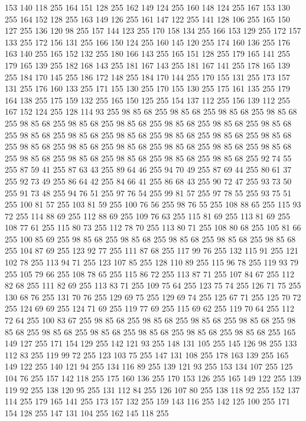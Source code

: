 153 140 118 255 164 151 128 255 162 149 124 255 160 148 124 255 167 153 130 255 164 152 128 255 163 149 126 255 161 147 122 255 141 128 106 255 165 150 127 255 136 120 98 255 157 144 123 255 170 158 134 255 166 153 129 255 172 157 133 255 172 156 131 255 166 150 124 255 160 145 120 255 174 160 136 255 176 163 140 255 165 152 132 255 180 166 143 255 165 151 128 255 179 165 141 255 179 165 139 255 182 168 143 255 181 167 143 255 181 167 141 255 178 165 139 255 184 170 145 255 186 172 148 255 184 170 144 255 170 155 131 255 173 157 131 255 176 160 133 255 171 155 130 255 170 155 130 255 175 161 135 255 179 164 138 255 175 159 132 255 165 150 125 255 154 137 112 255 156 139 112 255 167 152 124 255 128 114 93 255 98 85 68 255 98 85 68 255 98 85 68 255 98 85 68 255 98 85 68 255 98 85 68 255 98 85 68 255 98 85 68 255 98 85 68 255 98 85 68 255 98 85 68 255 98 85 68 255 98 85 68 255 98 85 68 255 98 85 68 255 98 85 68 255 98 85 68 255 98 85 68 255 98 85 68 255
98 85 68 255 98 85 68 255 98 85 68 255 98 85 68 255 98 85 68 255 98 85 68 255 98 85 68 255 98 85 68 255 92 74 55 255 87 59 41 255 87 63 43 255 89 64 46 255 94 70 49 255 87 69 44 255 80 61 37 255 92 73 49 255 86 64 42 255 84 66 41 255 86 68 43 255 90 72 47 255 93 73 50 255 91 73 48 255 94 76 51 255 97 76 54 255 99 81 57 255 97 78 55 255 93 75 51 255 100 81 57 255 103 81 59 255 100 76 56 255 98 76 55 255 108 88 65 255 115 93 72 255 114 88 69 255 112 88 69 255 109 76 63 255 115 81 69 255 113 81 69 255 108 77 61 255 115 80 73 255 112 78 70 255 113 80 71 255 108 80 68 255 105 81 66 255 100 85 69 255 98 85 68 255 98 85 68 255 98 85 68 255 98 85 68 255 98 85 68 255 104 87 69 255 123 92 77 255 111 87 68 255 117 99 76 255 132 115 91 255 121 102 78 255 113 94 71 255 123 107 85 255 128 110 89 255 115 96 78 255 119 93 79 255 105 79 66 255 108 78 65 255 115 86 72 255
113 87 71 255 107 84 67 255 112 82 68 255 111 82 69 255 113 83 71 255 109 75 64 255 123 75 74 255 126 71 75 255 130 68 76 255 131 70 76 255 129 69 75 255 129 69 74 255 125 67 71 255 125 70 72 255 124 69 69 255 124 71 69 255 119 77 69 255 115 69 62 255 119 70 64 255 112 72 64 255 100 83 67 255 98 85 68 255 98 85 68 255 98 85 68 255 98 85 68 255 98 85 68 255 98 85 68 255 98 85 68 255 98 85 68 255 98 85 68 255 98 85 68 255 165 149 127 255 171 154 129 255 142 121 93 255 148 131 105 255 145 126 98 255 133 112 83 255 119 99 72 255 123 103 75 255 147 131 108 255 178 163 139 255 165 149 122 255 140 121 94 255 134 116 89 255 139 121 93 255 153 134 107 255 125 104 76 255 157 142 118 255 175 160 136 255 170 153 126 255 165 149 122 255 139 119 92 255 138 120 95 255 131 112 84 255 126 107 80 255 138 118 92 255 152 137 114 255 179 165 141 255 173 157 132 255 159 143 116 255 142 125 100 255 171 154 128 255 147 131 104 255 162 145 118 255
